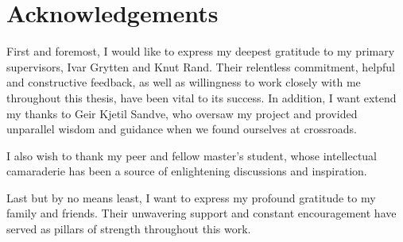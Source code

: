 \section*{Acknowledgements}
First and foremost, I would like to express my deepest gratitude to my primary supervisors, Ivar Grytten and Knut Rand.
Their relentless commitment, helpful and constructive feedback, as well as willingness to work closely with me throughout this thesis, have been vital to its success.
In addition, I want extend my thanks to Geir Kjetil Sandve, who oversaw my project and provided unparallel wisdom and guidance when we found ourselves at crossroads.

I also wish to thank my peer and fellow master's student, whose intellectual camaraderie has been a source of enlightening discussions and inspiration.

Last but by no means least, I want to express my profound gratitude to my family and friends. Their unwavering support and constant encouragement have served as pillars of strength throughout this work.
